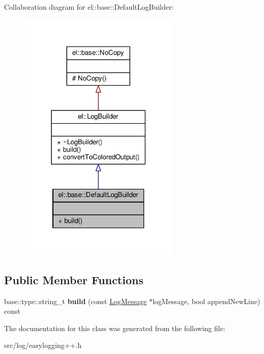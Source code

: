 Collaboration diagram for el\+:\+:base\+:\+:Default\+Log\+Builder\+:
\nopagebreak
\begin{figure}[H]
\begin{center}
\leavevmode
\includegraphics[width=218pt]{d1/d12/classel_1_1base_1_1DefaultLogBuilder__coll__graph}
\end{center}
\end{figure}
\subsection*{Public Member Functions}
\begin{DoxyCompactItemize}
\item 
base\+::type\+::string\+\_\+t {\bfseries build} (const \hyperlink{classel_1_1LogMessage}{Log\+Message} $\ast$log\+Message, bool append\+New\+Line) const \hypertarget{classel_1_1base_1_1DefaultLogBuilder_aa8d2f42068115d899ed81de1b0ed360e}{}\label{classel_1_1base_1_1DefaultLogBuilder_aa8d2f42068115d899ed81de1b0ed360e}

\end{DoxyCompactItemize}


The documentation for this class was generated from the following file\+:\begin{DoxyCompactItemize}
\item 
src/log/easylogging++.\+h\end{DoxyCompactItemize}
